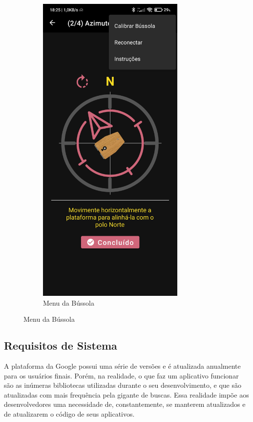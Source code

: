 \begin{figure}[!htb]
\begin{subfigure}[b]{0.3\textwidth}
		\includegraphics[width=0.8\textwidth]{figuras/desAplicativo/overbus}
		\caption{Menu da Bússola}
		\label{elevacao}
		
	\end{subfigure}
\end{figure}

\subsection{Requisitos de Sistema}

A plataforma da Google possui uma série de versões e é atualizada anualmente para os usuários finais. Porém, na realidade, o que faz um aplicativo funcionar são as inúmeras bibliotecas utilizadas durante o seu desenvolvimento, e que são atualizadas com mais frequência pela gigante de buscas. Essa realidade impõe aos desenvolvedores uma necessidade de, constantemente, se manterem atualizados e de atualizarem o código de seus aplicativos. 

